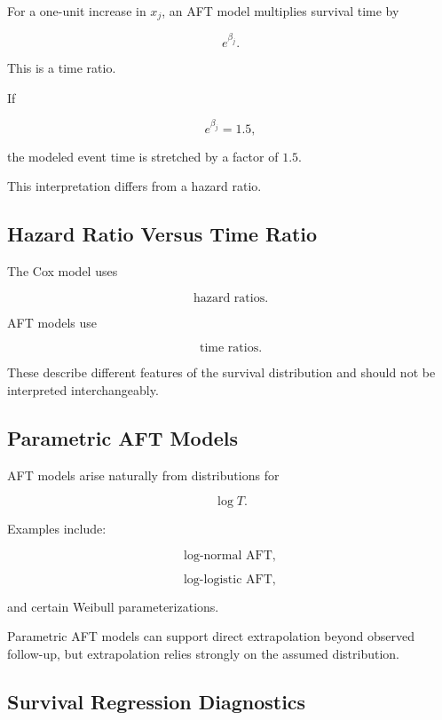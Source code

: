 For a one-unit increase in \(x_j\), an AFT model multiplies survival time
by

\[
\boxed{
e^{\beta_j}.
}
\]

This is a time ratio.

If

\[
e^{\beta_j}=1.5,
\]

the modeled event time is stretched by a factor of \(1.5\).

This interpretation differs from a hazard ratio.

\subsection{Hazard Ratio Versus Time Ratio}
\label{subsec:hazard-ratio-versus-time-ratio}

The Cox model uses

\[
\boxed{
\text{hazard ratios}.
}
\]

AFT models use

\[
\boxed{
\text{time ratios}.
}
\]

These describe different features of the survival distribution and should
not be interpreted interchangeably.

\subsection{Parametric AFT Models}
\label{subsec:parametric-aft-models}

AFT models arise naturally from distributions for

\[
\log T.
\]

Examples include:

\[
\boxed{
\text{log-normal AFT},
}
\]

\[
\boxed{
\text{log-logistic AFT},
}
\]

and certain Weibull parameterizations.

Parametric AFT models can support direct extrapolation beyond observed
follow-up, but extrapolation relies strongly on the assumed distribution.

\subsection{Survival Regression Diagnostics}
\label{subsec:survival-regression-diagnostics}

